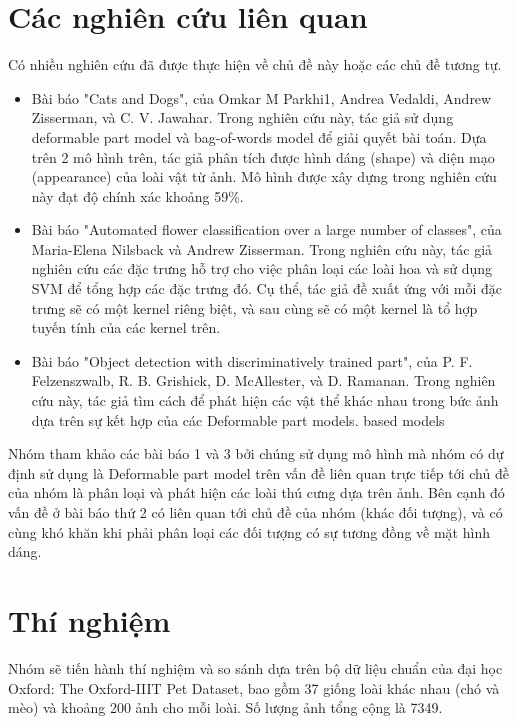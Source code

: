 \documentclass{article}
\begin{document}
	\section{Các nghiên cứu liên quan}
	Có nhiều nghiên cứu đã được thực hiện về chủ đề này hoặc các chủ đề tương tự.
	\begin{itemize}
		\item Bài báo "Cats and Dogs", của Omkar M Parkhi1, Andrea Vedaldi, Andrew Zisserman, và C. V. Jawahar. Trong nghiên cứu này, tác giả sử dụng deformable part model và bag-of-words model để giải quyết bài toán. Dựa trên 2 mô hình trên, tác giả phân tích được hình dáng (shape) và diện mạo (appearance) của loài vật từ ảnh. Mô hình được xây dựng trong nghiên cứu này đạt độ chính xác khoảng 59\%.
		\item Bài báo "Automated flower classification over a large number of classes", của Maria-Elena Nilsback và Andrew Zisserman. Trong nghiên cứu này, tác giả nghiên cứu các đặc trưng hỗ trợ cho việc phân loại các loài hoa và sử dụng SVM để tổng hợp các đặc trưng đó. Cụ thể, tác giả đề xuất ứng với mỗi đặc trưng sẽ có một kernel riêng biệt, và sau cùng sẽ có một kernel là tổ hợp tuyến tính của các kernel trên. 
		\item Bài báo "Object detection with discriminatively trained part", của P. F. Felzenszwalb, R. B. Grishick, D. McAllester, và D. Ramanan. Trong nghiên cứu này, tác giả tìm cách để phát hiện các vật thể khác nhau trong bức ảnh dựa trên sự kết hợp của các Deformable part models.
		based models
	\end{itemize}
	Nhóm tham khảo các bài báo 1 và 3 bởi chúng sử dụng mô hình mà nhóm có dự định sử dụng là Deformable part model trên vấn đề liên quan trực tiếp tới chủ đề của nhóm là phân loại và phát hiện các loài thú cưng dựa trên ảnh. Bên cạnh đó vấn đề ở bài báo thứ 2 có liên quan tới chủ đề của nhóm (khác đối tượng), và có cùng khó khăn khi phải phân loại các đối tượng có sự tương đồng về mặt hình dáng.

	\section{Thí nghiệm}
	Nhóm sẽ tiến hành thí nghiệm và so sánh dựa trên bộ dữ liệu chuẩn của đại học Oxford: The Oxford-IIIT Pet Dataset, bao gồm 37 giống loài khác nhau (chó và mèo) và khoảng 200 ảnh cho mỗi loài. Số lượng ảnh tổng cộng là 7349.
	
\end{document}
